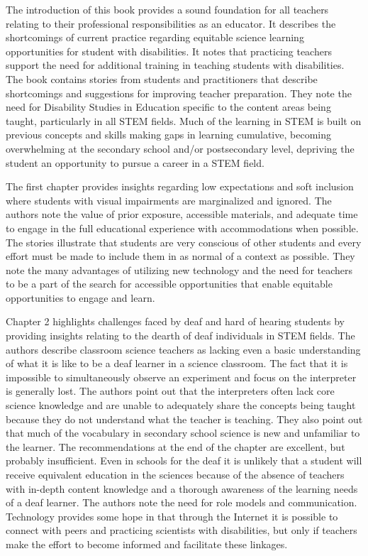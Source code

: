 \documentclass[11.5pt]{sig-alternate} %
\begin{document}
\begin{large}
The introduction of this book provides a sound foundation for all teachers relating to their professional responsibilities as an educator.  It describes the shortcomings of current practice regarding equitable science learning opportunities for student with disabilities.  It notes that practicing teachers support the need for additional training in teaching students with disabilities.  The book contains stories from students and practitioners that describe shortcomings and suggestions for improving teacher preparation. They note the need for Disability Studies in Education specific to the content areas being taught, particularly in all STEM fields.  Much of the learning in STEM is built on previous concepts and skills making gaps in learning cumulative, becoming overwhelming at the secondary school and/or postsecondary level, depriving the student an opportunity to pursue a career in a STEM field.

The first chapter provides insights regarding low expectations and soft inclusion where students with visual impairments are marginalized and ignored.  The authors note the value of prior exposure, accessible materials, and adequate time to engage in the full educational experience with accommodations when possible. The stories illustrate that students are very conscious of other students and every effort must be made to include them in as normal of a context as possible. They note the many advantages of utilizing new technology and the need for teachers to be a part of the search for accessible opportunities that enable equitable opportunities to engage and learn.

Chapter 2 highlights challenges faced by deaf and hard of hearing students by providing insights relating to the dearth of deaf individuals in STEM fields.  The authors describe classroom science teachers as lacking even a basic understanding of what it is like to be a deaf learner in a science classroom.  The fact that it is impossible to simultaneously observe an experiment and focus on the interpreter is generally lost. The authors point out that the interpreters often lack core science knowledge and are unable to adequately share the concepts being taught because they do not understand what the teacher is teaching.  They also point out that much of the vocabulary in secondary school science is new and unfamiliar to the learner.  The recommendations at the end of the chapter are excellent, but probably insufficient.  Even in schools for the deaf it is unlikely that a student will receive equivalent education in the sciences because of the absence of teachers with in-depth content knowledge and a thorough awareness of the learning needs of a deaf learner.  The authors note the need for role models and communication.  Technology provides some hope in that through the Internet it is possible to connect  with peers and practicing scientists with disabilities, but only if teachers make the effort to become informed and facilitate these linkages.  


\end{large}
\end{document}
